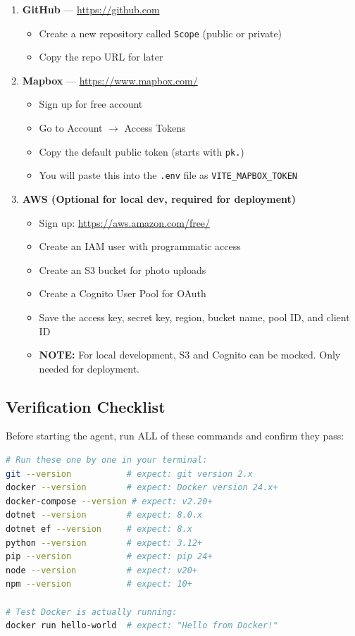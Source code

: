 \documentclass[12pt,letterpaper]{article}
\begin{document}
\begin{enumerate}

  \item \textbf{GitHub} --- \url{https://github.com}
  \begin{itemize}
    \item Create a new repository called \texttt{Scope} (public or private)
    \item Copy the repo URL for later
  \end{itemize}

  \item \textbf{Mapbox} --- \url{https://www.mapbox.com/}
  \begin{itemize}
    \item Sign up for free account
    \item Go to Account $\rightarrow$ Access Tokens
    \item Copy the default public token (starts with \texttt{pk.})
    \item You will paste this into the \texttt{.env} file as \texttt{VITE\_MAPBOX\_TOKEN}
  \end{itemize}

  \item \textbf{AWS (Optional for local dev, required for deployment)}
  \begin{itemize}
    \item Sign up: \url{https://aws.amazon.com/free/}
    \item Create an IAM user with programmatic access
    \item Create an S3 bucket for photo uploads
    \item Create a Cognito User Pool for OAuth
    \item Save the access key, secret key, region, bucket name, pool ID, and client ID
    \item \textbf{NOTE:} For local development, S3 and Cognito can be mocked. Only needed for deployment.
  \end{itemize}

\end{enumerate}

\subsection{Verification Checklist}

Before starting the agent, run ALL of these commands and confirm they pass:

\begin{lstlisting}[style=code,language=bash]
# Run these one by one in your terminal:
git --version           # expect: git version 2.x
docker --version        # expect: Docker version 24.x+
docker-compose --version # expect: v2.20+
dotnet --version        # expect: 8.0.x
dotnet ef --version     # expect: 8.x
python --version        # expect: 3.12+
pip --version           # expect: pip 24+
node --version          # expect: v20+
npm --version           # expect: 10+

# Test Docker is actually running:
docker run hello-world  # expect: "Hello from Docker!"
\end{lstlisting}
\end{document}
